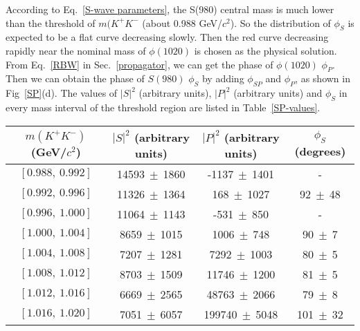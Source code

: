 \documentclass[aps,prd,twocolumn,showpacs,amsmath,amssymb]{revtex4-1}
\begin{document}
    According to Eq.~\ref{S-wave parameters}, the S(980) central mass is much lower than the threshold of $m(K^{+}K^{-}$ (about 0.988 GeV/$c^{2}$).
    So the distribution of $\phi_{S}$ is expected to be a flat curve decreasing slowly.
    Then the red curve decreasing rapidly near the nominal mass of $\phi(1020)$ is chosen as the physical solution.
    From Eq.~\ref{RBW} in Sec.~\ref{propagator}, we can get the phase of $\phi(1020)$ $\phi_{P}$.
    Then we can obtain the phase of $S(980)$ $\phi_{S}$ by adding $\phi_{SP}$ and $\phi_{P}$, as shown in Fig~\ref{SP}(d).
    The values of $\left|S\right|^{2}$ (arbitrary units), $\left|P\right|^{2}$ (arbitrary units) and $\phi_{S}$ in every mass interval of the threshold region are listed in Table~\ref{SP-values}.
    \begin{table*}[htbp]
        \caption{
            The values of $\left|S\right|^{2}$ (arbitrary units), $\left|P\right|^{2}$ (arbitrary units) and $\phi_{S}$.
            The values of 
            Uncertainties in the table are statistical only.
        }
        \label{SP-values}
        \begin{center}
            \begin{tabular}{cccc}
                \hline\hline
                $m(K^{+}K^{-})$ (GeV/$c^{2}$) & $\left|S\right|^{2}$ (arbitrary units) & $\left|P\right|^{2}$ (arbitrary units) & $\phi_{S}$ (degrees)\\
                \hline
                $[0.988,\ 0.992]$   &	14593$\ \pm\ $1860&	-1137$\ \pm\ $1401&	 - \\ 	
                $[0.992,\ 0.996]$   &	11326$\ \pm\ $1364&	168$\ \pm\ $1027&	92$\ \pm\ $48 \\ 	
                $[0.996,\ 1.000]$   &	11064$\ \pm\ $1143&	-531$\ \pm\ $850&	 - \\ 	
                $[1.000,\ 1.004]$   &	8659$\ \pm\ $1015&	1006$\ \pm\ $748&	90$\ \pm\ $7 \\ 	
                $[1.004,\ 1.008]$   &	7207$\ \pm\ $1281&	7292$\ \pm\ $1003&	80$\ \pm\ $5 \\ 	
                $[1.008,\ 1.012]$   &	8703$\ \pm\ $1509&	11746$\ \pm\ $1200&	81$\ \pm\ $5 \\ 	
                $[1.012,\ 1.016]$   &	6669$\ \pm\ $2565&	48763$\ \pm\ $2066&	79$\ \pm\ $8 \\ 	
                $[1.016,\ 1.020]$   &	7051$\ \pm\ $6057&	199740$\ \pm\ $5048&	101$\ \pm\ $32 \\ 	

\end{tabular}
\end{center}
\end{table*}
\end{document}
